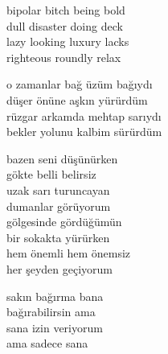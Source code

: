 \documentclass[10pt, openright, oneside]{memoir}
\theoremstyle{definition}
\begin{document}
\vspace*{\fill}
%
\newpage
{}
\vspace*{\fill}
\settowidth{\versewidth}{lazy looking luxury lacks}
\begin{cverse}
  bipolar bitch being bold \\
  dull disaster doing deck \\
  lazy looking luxury lacks \\
  righteous roundly relax
\end{cverse}
\vspace*{\fill}
%
\newpage
{}
\vspace*{\fill}
\settowidth{\versewidth}{rüzgar arkamda mehtap sarıydı}
\begin{cverse}
  o zamanlar bağ üzüm bağıydı \\
  düşer önüne aşkın yürürdüm \\
  rüzgar arkamda mehtap sarıydı \\
  bekler yolunu kalbim sürürdüm
\end{cverse}
\vspace*{\fill}
%
\newpage
{}
\vspace*{\fill}
\settowidth{\versewidth}{hem önemli hem önemsiz}
\begin{cverse}
  bazen seni düşünürken \\
  gökte belli belirsiz \\
  uzak sarı turuncayan \\
  dumanlar görüyorum \\
  gölgesinde gördüğümün \\
  bir sokakta yürürken \\
  hem önemli hem önemsiz \\
  her şeyden geçiyorum
\end{cverse}
\vspace*{\fill}
%
\newpage
{}
\vspace*{\fill}
\settowidth{\versewidth}{sana izin veriyorum}
\begin{cverse}
  sakın bağırma bana \\
  bağırabilirsin ama \\
  sana izin veriyorum \\
  ama sadece sana
\end{cverse}
\vspace*{\fill}
\end{document}
